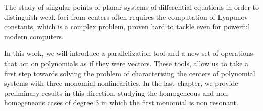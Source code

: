 
\newenvironment{abstract}%
{\clearpage%
\null\vfill\begin{center}%
\bfseries\abstractname\end{center}}%
{\vfill\null}
\begin{abstract}
The study of singular points of planar systems of differential equations in order to distinguish weak foci from centers often requires the computation of Lyapunov constants, which is a complex problem, proven hard to tackle even for powerful modern computers.

In this work, we will introduce a parallelization tool and a new set of operations that act on polynomials as if they were vectors. These tools, allow us to take a first step towards solving the problem of characterising the centers of polynomial systems with three monomial nonlinearities. In the last chapter, we provide preliminary results in this direction, studying the homogeneous and non homogeneous cases of degree 3 in which the first monomial is non resonant.
\end{abstract}

